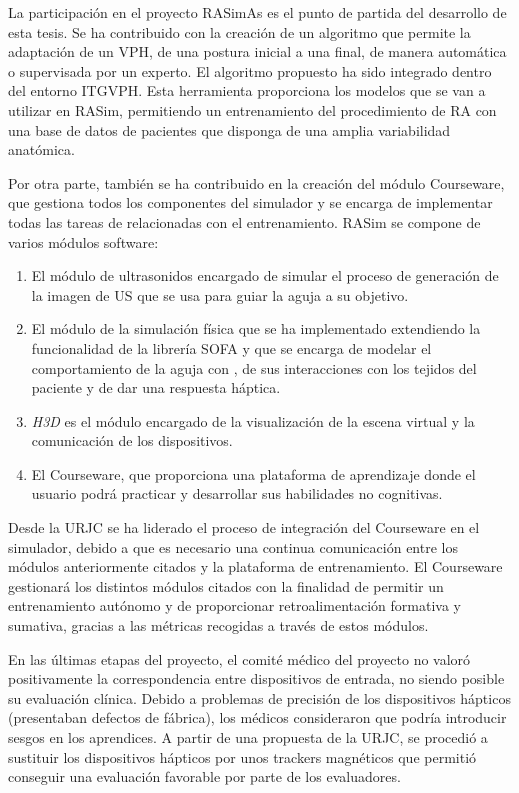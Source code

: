 La participación en el proyecto \ac{RASimAs} es el punto de partida del desarrollo de esta tesis. Se ha contribuido con la creación de un algoritmo que permite la adaptación de un \ac{VPH}, de una postura inicial a una final, de manera automática o supervisada por un experto.
El algoritmo propuesto ha sido integrado dentro del entorno \ac{ITGVPH}.
Esta herramienta proporciona los modelos que se van a utilizar en \ac{RASim}, permitiendo un entrenamiento del procedimiento de \ac{RA} con una base de datos de pacientes que disponga de una amplia variabilidad anatómica.

Por otra parte, también se ha contribuido en la creación del módulo \ac{Courseware}, que gestiona todos los componentes del simulador y se encarga de implementar todas las tareas de relacionadas con el entrenamiento. \ac{RASim} se compone de varios módulos software:
\begin{enumerate}
    \item El módulo de ultrasonidos \cite{Law2015} encargado de simular el proceso de generación de la imagen de \ac{US} que se usa para guiar la aguja a su objetivo.
    \item El módulo de la simulación física que se ha implementado extendiendo la funcionalidad de la librería \ac{SOFA} \cite{sofaweb} y que se encarga de modelar el comportamiento de la aguja con \cite{needleinsertion}, de sus interacciones con los tejidos del paciente y de dar una respuesta háptica.
    \item \emph{H3D} \cite{sensegraphics2012open} es el módulo encargado de la visualización de la escena virtual y la comunicación de los dispositivos.
    \item El \ac{Courseware}, que proporciona una plataforma de aprendizaje donde el usuario podrá practicar y desarrollar sus habilidades no cognitivas.
\end{enumerate}
Desde la \ac{URJC} se ha liderado el proceso de integración del \ac{Courseware} en el simulador, debido a que es necesario una continua comunicación entre los módulos anteriormente citados y la plataforma de entrenamiento. El \ac{Courseware} gestionará los distintos módulos citados con la finalidad de permitir un entrenamiento autónomo y de proporcionar retroalimentación formativa y sumativa, gracias a las métricas recogidas a través de estos módulos.

En las últimas etapas del proyecto, el comité médico del proyecto no valoró positivamente la correspondencia entre dispositivos de entrada, no siendo posible su evaluación clínica. Debido a problemas de precisión de los dispositivos hápticos (presentaban defectos de fábrica), los médicos consideraron que podría introducir sesgos en los aprendices. A partir de una propuesta de la \ac{URJC}, se procedió a sustituir los dispositivos hápticos por unos \acs{tracker}s magnéticos que permitió conseguir una evaluación favorable por parte de los evaluadores.


